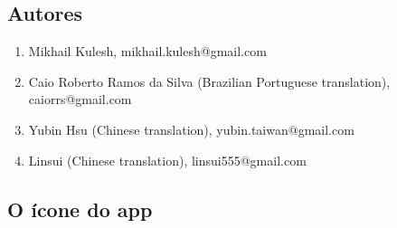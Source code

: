 \documentclass[DIV=calc, paper=a4, fontsize=11pt, twocolumn]{scrartcl}
\begin{document}
\subsection{Autores}

\begin{enumerate}
\item Mikhail Kulesh,
mikhail.kulesh@gmail.com

\item Caio Roberto Ramos da Silva
(Brazilian Portuguese translation),
caiorrs@gmail.com

\item Yubin Hsu
(Chinese translation),
yubin.taiwan@gmail.com

\item Linsui
(Chinese translation),
linsui555@gmail.com
\end{enumerate}

\subsection{O ícone do app}
\end{document}
